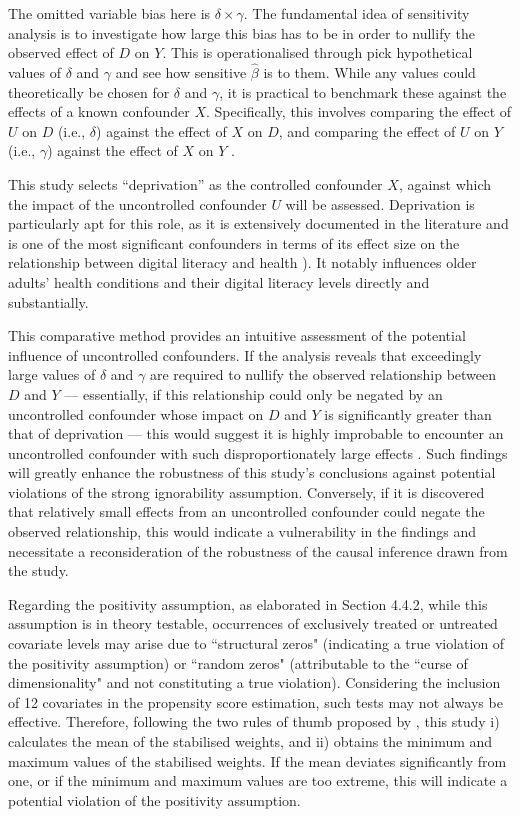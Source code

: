 The omitted variable bias here is $\delta \times \gamma$. The fundamental idea of sensitivity analysis is to investigate how large this bias has to be in order to nullify the observed effect of $D$ on $Y$. This is operationalised through pick hypothetical values of $\delta$ and $\gamma$ and see how sensitive $\hat{\beta}$ is to them. While any values could theoretically be chosen for $\delta$ and $\gamma$, it is practical to benchmark these against the effects of a known confounder $X$. Specifically, this involves comparing the effect of $U$ on $D$ (i.e., $\delta$) against the effect of $X$ on $D$, and comparing the effect of $U$ on $Y$ (i.e., $\gamma$) against the effect of $X$ on $Y$ \parencite{vanderweele_sensitivity_2017}. 

This study selects ``deprivation” as the controlled confounder $X$, against which the impact of the uncontrolled confounder $U$ will be assessed. Deprivation is particularly apt for this role, as it is extensively documented in the literature and is one of the most significant confounders in terms of its effect size on the relationship between digital literacy and health \parencite{hall_digital_2015,he_factors_2022}). It notably influences older adults' health conditions and their digital literacy levels directly and substantially. 

This comparative method provides an intuitive assessment of the potential influence of uncontrolled confounders. If the analysis reveals that exceedingly large values of $\delta$ and $\gamma$ are required to nullify the observed relationship between $D$ and $Y$ — essentially, if this relationship could only be negated by an uncontrolled confounder whose impact on $D$ and $Y$ is significantly greater than that of deprivation — this would suggest it is highly improbable to encounter an uncontrolled confounder with such disproportionately large effects \parencite{shen_sensitivity_2011}. Such findings will greatly enhance the robustness of this study's conclusions against potential violations of the strong ignorability assumption. Conversely, if it is discovered that relatively small effects from an uncontrolled confounder could negate the observed relationship, this would indicate a vulnerability in the findings and necessitate a reconsideration of the robustness of the causal inference drawn from the study.

Regarding the positivity assumption, as elaborated in Section 4.4.2, while this assumption is in theory testable, occurrences of exclusively treated or untreated covariate levels may arise due to ``structural zeros" (indicating a true violation of the positivity assumption) or ``random zeros" (attributable to the ``curse of dimensionality" and not constituting a true violation). Considering the inclusion of 12 covariates in the propensity score estimation, such tests may not always be effective. Therefore, following the two rules of thumb proposed by \textcite{cole_constructing_2008}, this study i) calculates the mean of the stabilised weights, and ii) obtains the minimum and maximum values of the stabilised weights. If the mean deviates significantly from one, or if the minimum and maximum values are too extreme, this will indicate a potential violation of the positivity assumption. 

